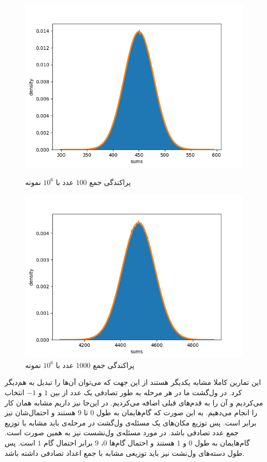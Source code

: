 \documentclass[11pt, a4paper]{article}
\begin{document}
\begin{figure}[h!]
\begin{minipage}[b]{0.48\textwidth}
    \includegraphics[width=\textwidth]{q3_100_1000000.png}
    \caption{پراکندگی‌ جمع $100$ عدد با $10^6$ نمونه}
    \label{fig:q3_100}
  \end{minipage}
  \hfill
  \begin{minipage}[b]{0.48\textwidth}
    \includegraphics[width=\textwidth]{q3_1000_1000000.png}
    \caption{پراکندگی‌ جمع $1000$ عدد با $10^6$ نمونه}
    \label{fig:q3_1000}
  \end{minipage}
\end{figure}

این تمارین کاملا مشابه یکدیگر هستند از این جهت که می‌توان آن‌ها را تبدیل به هم‌دیگر کرد.
در ول‌گشت ما در هر مر‌حله به طور تصادفی یک عدد از بین
$1$
و
$-1$
انتخاب می‌کردیم و آن را به قدم‌های قبلی اضافه می‌کردیم.
در این‌جا نیز داریم مشابه همان کار را انجام می‌دهیم.
به این صورت که گام‌هایمان به طول
$0$
تا
$9$
هستند و احتمال‌شان نیز برابر است.
پس توزیع مکان‌های یک مسئله‌ی ول‌گشت در مرحله‌ی
باید مشابه با توزیع جمع
عدد تصادفی باشد.
در مورد مسئله‌ی ول‌نشست نیز به همین صورت است.
گام‌هایمان به طول‌
$0$
و
$1$
هستند و احتمال گام‌ها
$0$،
$9$
برابر احتمال گام
$1$
است.
پس طول دسته‌های ول‌نشت نیز باید توزیعی مشابه با جمع اعداد تصادفی داشته باشد.
\end{document}
